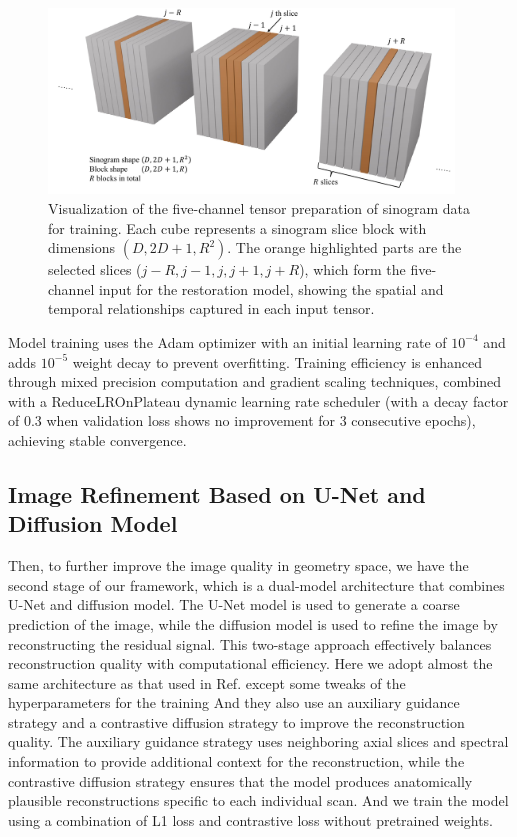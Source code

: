 \documentclass[aps,prb,preprint,groupedaddress,showkeys]{revtex4}
\begin{document}
\begin{figure}[htbp]
\centering
\vspace{-.3cm}
\includegraphics[width=0.96\textwidth]{Images/slices.pdf}
\vspace{-.3cm}
\caption{Visualization of the five-channel tensor preparation of sinogram data for training. Each cube represents a sinogram slice block with dimensions $(D, 2D+1, R^2)$. The orange highlighted parts are the selected slices ($j-R, j-1, j, j+1, j+R$), which form the five-channel input for the restoration model, showing the spatial and temporal relationships captured in each input tensor.}
\label{fig:sinogram_structure}
\end{figure}



Model training uses the Adam optimizer with an initial learning rate of $10^{-4}$ and adds   $10^{-5}$ weight decay to prevent overfitting. 
Training efficiency is enhanced through mixed precision computation and gradient scaling techniques, combined with a ReduceLROnPlateau dynamic learning rate scheduler (with a decay factor of 0.3 when validation loss shows no improvement for 3 consecutive epochs), achieving stable convergence.


\subsection{Image Refinement Based on U-Net and Diffusion Model}
\label{sec:diffusion_model}
Then, to further improve the image quality in geometry space, we have the second stage of our framework, which is a dual-model architecture that combines U-Net and diffusion model. The U-Net model is used to generate a coarse prediction of the image, while the diffusion model is used to refine the image by reconstructing the residual signal. This two-stage approach effectively balances reconstruction quality with computational efficiency.
Here we adopt almost the same architecture as that used in Ref. \cite{han2023} except some tweaks of the hyperparameters for the training
And they also use an auxiliary guidance strategy and a contrastive diffusion strategy to improve the reconstruction quality. The auxiliary guidance strategy uses neighboring axial slices and spectral information to provide additional context for the reconstruction, while the contrastive diffusion strategy ensures that the model produces anatomically plausible reconstructions specific to each individual scan. 
And we train the model using a combination of L1 loss and contrastive loss without pretrained weights. 
\end{document}

